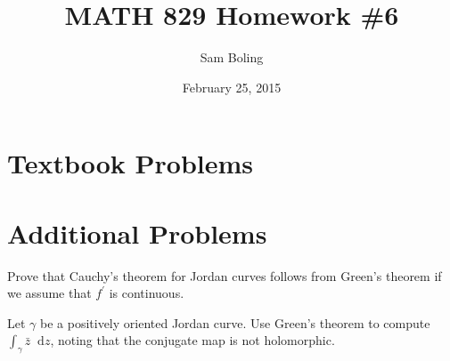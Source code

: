 \documentclass{article}
\title{MATH 829 Homework \#6}
\date{February 25, 2015}
\author{Sam Boling}
\newcommand\dif{\mathop{}\!\mathrm{d}}
\newcounter{Problem}
\newenvironment{Problem}{\begin{Exercise}[name={Problem},
                                          counter={Problem}]}
                        {\end{Exercise}}
\begin{document}
\begin{titlepage}
\maketitle
\end{titlepage}

\section{Textbook Problems}

\section{Additional Problems}
\begin{Problem}
Prove that Cauchy's theorem for Jordan curves follows from
Green's theorem if we assume that $f^\prime$ is continuous.
\end{Problem}

\begin{Answer}
\end{Answer}

\begin{Problem}
Let $\gamma$ be a positively oriented Jordan curve. Use
Green's theorem to compute $\int_\gamma \bar{z} \dif z$,
noting that the conjugate map is not holomorphic.
\end{Problem}
\end{document}
